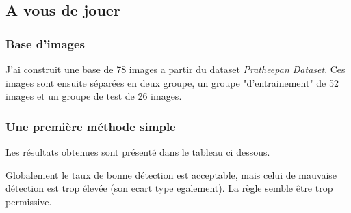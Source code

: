 \documentclass{article}
\begin{document}
\subsection{A vous de jouer}
\subsubsection{Base d'images}
J'ai construit une base de 78 images a partir du dataset \emph{Pratheepan Dataset}. Ces images sont ensuite séparées en deux groupe, un groupe "d'entrainement" de 52 images et un groupe de test de 26 images.

\subsubsection{Une première méthode simple}
Les résultats obtenues sont présenté dans le tableau ci dessous.

\begin{table}[h!]
\centering
{}
\caption{Résultats de la méthode de Peer et Al.}
\label{peer-et-al}
\end{table}


 Globalement le taux de bonne détection est acceptable, mais celui de mauvaise détection est trop élevée (son ecart type egalement). La règle semble être trop permissive.
\end{document}
